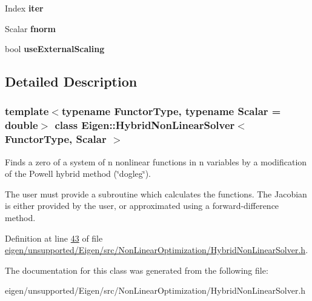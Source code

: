 \begin{DoxyCompactItemize}
\mbox{\label{class_eigen_1_1_hybrid_non_linear_solver_a1fb82aaeaf6aa1ae3ab3f7d0b33b4e3f}} 
Index {\bfseries iter}
\item 
\mbox{\label{class_eigen_1_1_hybrid_non_linear_solver_a7472a71945ab2be2a7813c84f63ab871}} 
Scalar {\bfseries fnorm}
\item 
\mbox{\label{class_eigen_1_1_hybrid_non_linear_solver_a29cf13648a7d6accc89fd1dc621eb92b}} 
bool {\bfseries use\+External\+Scaling}
\end{DoxyCompactItemize}


\subsection{Detailed Description}
\subsubsection*{template$<$typename Functor\+Type, typename Scalar = double$>$\newline
class Eigen\+::\+Hybrid\+Non\+Linear\+Solver$<$ Functor\+Type, Scalar $>$}

Finds a zero of a system of n nonlinear functions in n variables by a modification of the Powell hybrid method (\char`\"{}dogleg\char`\"{}). 

The user must provide a subroutine which calculates the functions. The Jacobian is either provided by the user, or approximated using a forward-\/difference method. 

Definition at line \hyperlink{eigen_2unsupported_2_eigen_2src_2_non_linear_optimization_2_hybrid_non_linear_solver_8h_source_l00043}{43} of file \hyperlink{eigen_2unsupported_2_eigen_2src_2_non_linear_optimization_2_hybrid_non_linear_solver_8h_source}{eigen/unsupported/\+Eigen/src/\+Non\+Linear\+Optimization/\+Hybrid\+Non\+Linear\+Solver.\+h}.



The documentation for this class was generated from the following file\+:\begin{DoxyCompactItemize}
\item 
eigen/unsupported/\+Eigen/src/\+Non\+Linear\+Optimization/\+Hybrid\+Non\+Linear\+Solver.\+h\end{DoxyCompactItemize}
